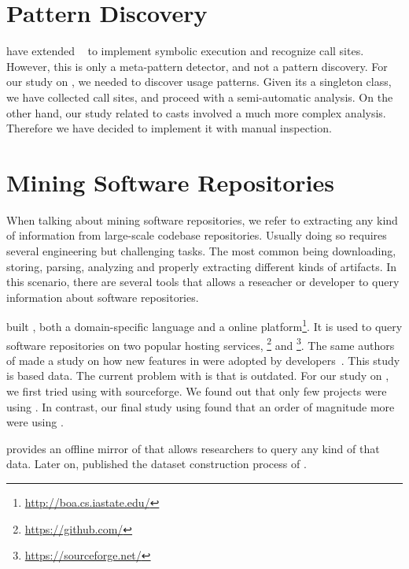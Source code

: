 \section{Pattern Discovery}

\cite{posnett_thex:_2010} have extended \asm{}~\cite{bruneton_asm:_2002,kuleshov_using_2007} to implement symbolic execution and recognize call sites.
However, this is only a meta-pattern detector, and not a pattern discovery.
For our study on \smu{}, we needed to discover usage patterns.
Given its a singleton class, we have collected call sites,
and proceed with a semi-automatic analysis.
On the other hand, our study related to casts involved a much more complex analysis.
Therefore we have decided to implement it with manual inspection.

\section{Mining Software Repositories}

When talking about mining software repositories, we refer to extracting any kind of information from large-scale codebase repositories.
Usually doing so requires several engineering but challenging tasks.
The most common being downloading, storing, parsing, analyzing and properly extracting different kinds of artifacts.
In this scenario, there are several tools that allows a reseacher or developer to query information about software repositories.

\cite{dyer_boa:_2013,dyer_declarative_2013} built \boa{}, both a domain-specific language and a online platform\footnote{\url{http://boa.cs.iastate.edu/}}.
It is used to query software repositories on two popular hosting services, \github{}\footnote{\url{https://github.com/}} and \sourceforge{}\footnote{\url{https://sourceforge.net/}}.
The same authors of \boa{} made a study on how new features in \java{} were adopted by developers~\cite{dyer_mining_2014}.
This study is based \sourceforge{} data.
The current problem with \sourceforge{} is that is outdated.
For our study on \smu{}, we first tried using \boa{} with sourceforge{}.
We found out that only few projects were using \smu{}.
In contrast, our final study using \maven{} found that an order of magnitude more were using \smu{}.

\cite{gousios_ghtorent_2013}
provides an offline mirror of \github{} that allows researchers to query any kind of that data.
Later on, \cite{gousios_lean_2014} published the dataset construction process of \github{}.


